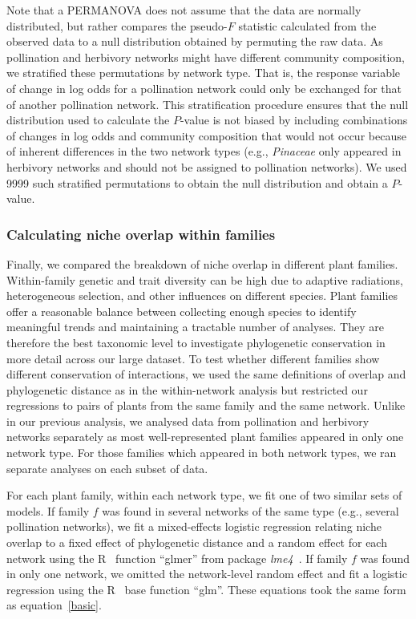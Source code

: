 \documentclass[12pt]{article}
\begin{document}
\begin{spacing}{1.5}
    Note that a PERMANOVA does not assume that the data are 
    normally distributed, but rather compares the pseudo-$F$ 
    statistic calculated from the observed data to a null 
    distribution obtained by permuting the raw data. As 
    pollination and herbivory networks might have different
    community composition, we stratified these permutations
    by network type. That is, the response variable of change in log odds for a pollination
    network could only be exchanged for that of another pollination
    network. This stratification procedure ensures that 
    the null distribution used to calculate the $P$-value is not 
    biased by including combinations of changes in log odds and 
    community composition that would not occur because of inherent 
    differences in the two network types (e.g., \emph{Pinaceae} 
    only appeared in herbivory networks and should not be assigned 
    to pollination networks). We used 9999 such stratified permutations 
    to obtain the null distribution and obtain a $P$-value.


  \subsubsection*{Calculating niche overlap within families}

    Finally, we compared the breakdown of niche overlap in different plant families.
    Within-family genetic and trait diversity can be high due to adaptive radiations, heterogeneous selection, and other influences on different species. 
    Plant families offer a reasonable balance between collecting enough species to identify meaningful trends and maintaining a tractable number of analyses. 
    They are therefore the best taxonomic level to investigate phylogenetic conservation in more detail across our large dataset.
    To test whether different families show different conservation of interactions, 
    we used the same definitions of 
    overlap and phylogenetic distance as in the within-network analysis but 
    restricted our regressions to pairs of plants from the same family and 
    the same network. Unlike in our previous analysis, we analysed data from 
    pollination and herbivory networks separately as most well-represented 
    plant families appeared in only one network type. For those families 
    which appeared in both network types, we ran separate analyses on each 
    subset of data.


    For each plant family, within each network type, we fit one of two 
    similar sets of models. If family $f$ was found in several networks of 
    the same type (e.g., several pollination networks), we fit a 
    mixed-effects logistic regression relating niche overlap to a fixed 
    effect of phylogenetic distance and a random effect for each network 
    using the R~\citep{R} function ``glmer'' from package
     \emph{lme4}~\citep{lme4}. If family $f$ was found in only one network, we omitted the 
    network-level random effect and fit a logistic regression using the 
    R~\citep{R} base function ``glm''. These equations took the same form as equation~\ref{basic}.



\end{spacing}
\end{document}
